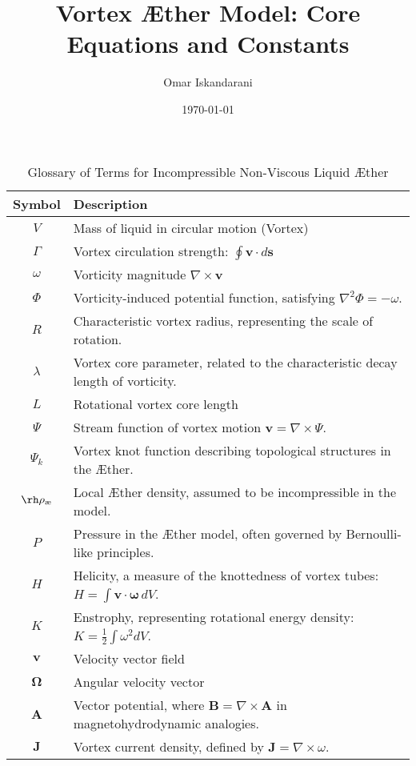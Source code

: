 \documentclass[a4paper,10pt]{article}
\title{Vortex \AE ther Model: Core Equations and Constants}
\author{Omar Iskandarani}
\date{\today}
\begin{document}
    \maketitle
    \begin{table}[htbp]
        \centering
        \renewcommand{\arraystretch}{1.0}
        \begin{tabular}{c l}
            \toprule
            Symbol & Description \\
            \midrule
            \( V \) & Mass of liquid in circular motion (Vortex) \\
            \( \Gamma \) & Vortex circulation strength: \( \oint \mathbf{v} \cdot d\mathbf{s} \) \\
            \( \omega \) & Vorticity magnitude \(\nabla \times \mathbf{v} \) \\
            \( \Phi \) & Vorticity-induced potential function, satisfying \( \nabla^2 \Phi = -\omega \). \\
            \( R \) & Characteristic vortex radius, representing the scale of rotation. \\
            \( \lambda \) & Vortex core parameter, related to the characteristic decay length of vorticity. \\
            \( L \) & Rotational vortex core length \\
            \( \Psi \) & Stream function of vortex motion \( \mathbf{v} = \nabla \times \Psi \). \\
            \( \Psi_k \) & Vortex knot function describing topological structures in the \AE ther. \\
            \( \rh\rho_\text{\ae} \) & Local \AE ther density, assumed to be incompressible in the model. \\
            \( P \) & Pressure in the \AE ther model, often governed by Bernoulli-like principles. \\
            \( H \) & Helicity, a measure of the knottedness of vortex tubes: \( H = \int \mathbf{v} \cdot \mathbf{\omega} \, dV \). \\
            \( K \) & Enstrophy, representing rotational energy density: \( K = \frac{1}{2} \int \omega^2 dV \). \\
            \( \mathbf{v} \) & Velocity vector field \\
            \( \mathbf{\Omega} \) & Angular velocity vector \\
            \( \mathbf{A} \) & Vector potential, where \( \mathbf{B} = \nabla \times \mathbf{A} \) in magnetohydrodynamic analogies. \\
            \( \mathbf{J} \) & Vortex current density, defined by \( \mathbf{J} = \nabla \times \omega \). \\
            \bottomrule
        \end{tabular}
        \caption{Glossary of Terms for Incompressible Non-Viscous Liquid \AE ther}
        \label{tab:symbols}
    \end{table}
\end{document}
